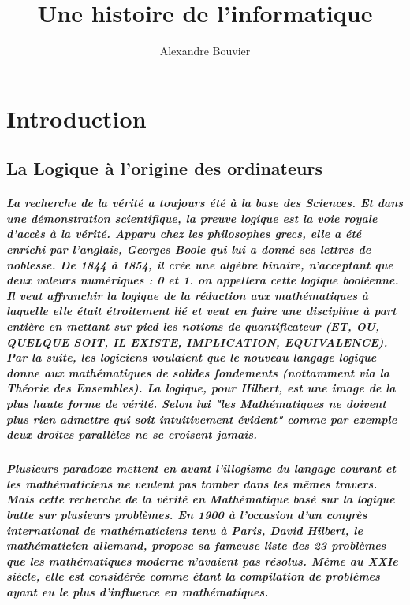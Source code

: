 \documentclass[a4paper, 11pt]{book}
\begin{document}
\title{Une histoire de l'informatique}
\author{Alexandre Bouvier}
\date{}

\mainmatter

\maketitle

\chapter*{Introduction}

\section{La Logique à l'origine des ordinateurs}

\paragraph{
  La recherche de la vérité a toujours été à la base des Sciences. Et dans une démonstration scientifique, la preuve logique est la voie royale d'accès à la vérité. Apparu chez les philosophes grecs, elle a été enrichi par l'anglais, Georges Boole qui lui a donné ses lettres de noblesse. De 1844 à 1854, il crée une algèbre binaire, n'acceptant que deux valeurs numériques : 0 et 1. on appellera cette logique booléenne. Il veut affranchir la logique de la réduction aux mathématiques à laquelle elle était étroitement lié et veut en faire une discipline à part entière en mettant sur pied les notions de quantificateur (ET, OU, QUELQUE SOIT, IL EXISTE, IMPLICATION, EQUIVALENCE). Par la suite, les logiciens voulaient que le nouveau langage logique donne aux mathématiques de solides fondements (nottamment via la Théorie des Ensembles). La logique, pour Hilbert, est une image de la plus haute forme de vérité. Selon lui "les Mathématiques ne doivent plus rien admettre  qui soit intuitivement évident" comme par exemple deux droites parallèles ne se croisent jamais.
}

\paragraph{
  Plusieurs paradoxe mettent en avant l'illogisme du langage courant et les mathématiciens ne veulent pas tomber dans les mêmes travers. Mais cette recherche de la vérité en Mathématique basé sur la logique butte sur plusieurs problèmes. En 1900 à l'occasion d'un congrès international de mathématiciens tenu à Paris, David Hilbert, le mathématicien allemand, propose sa fameuse liste des 23 problèmes que les mathématiques moderne n'avaient pas résolus. Même au XXIe siècle, elle est considérée comme étant la compilation de problèmes ayant eu le plus d'influence en mathématiques.
}
\end{document}
